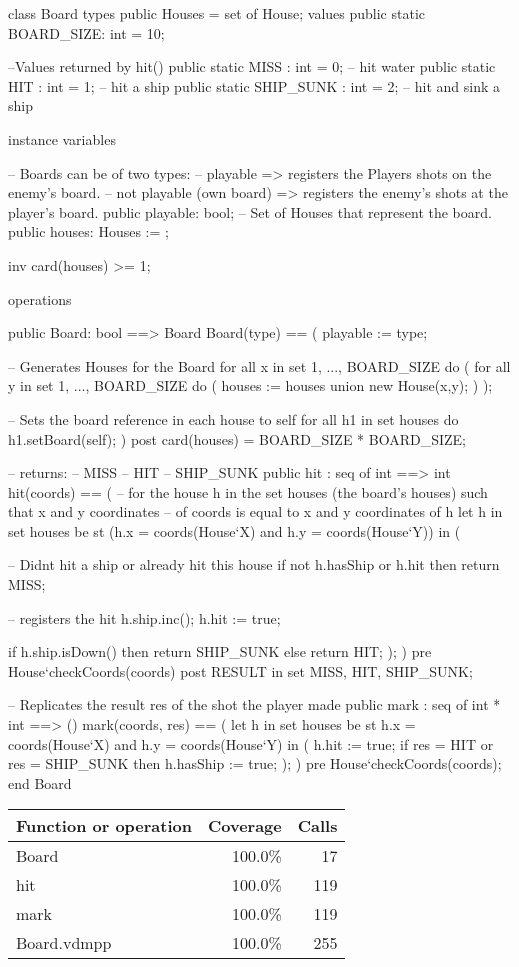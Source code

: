 \begin{vdm_al}
class Board
 types
  public Houses = set of House;
 values
  public static BOARD_SIZE: int = 10;
  
  --Values returned by hit()
  public static MISS : int = 0; -- hit water
  public static HIT : int = 1; -- hit a ship
  public static SHIP_SUNK : int = 2; -- hit and sink a ship
 
 instance variables

  -- Boards can be of two types:
  --  playable => registers the Players shots on the enemy's board.
  --  not playable (own board) => registers the enemy's shots at the player's board. 
  public playable: bool;
  -- Set of Houses that represent the board.
  public houses: Houses := {};
  
  inv card(houses) >= 1;
  
 operations

  public Board: bool ==> Board
   Board(type) == 
   (
    playable := type;
    
    -- Generates Houses for the Board
    for all x in set {1, ..., BOARD_SIZE}  do (
     for all y in set {1, ..., BOARD_SIZE} do (
      houses := houses union {new House(x,y)};
     )
    );
    
    -- Sets the board reference in each house to self
    for all h1 in set houses do h1.setBoard(self);
   )
  post card(houses) = BOARD_SIZE * BOARD_SIZE;
  
  
  -- returns:
  --  MISS
  --  HIT
  --  SHIP_SUNK
  public hit : seq of int ==> int
   hit(coords) ==
   (
    -- for the house h in the set houses (the board's houses) such that x and y coordinates
    --  of coords is equal to x and y coordinates of h 
    let h in set houses be st (h.x = coords(House`X) and h.y = coords(House`Y)) in (
    
     -- Didnt hit a ship or already hit this house
     if not h.hasShip or h.hit then return MISS;

     -- registers the hit
     h.ship.inc();
     h.hit := true;
     
     if h.ship.isDown() then return SHIP_SUNK
     else return HIT;
    );
   )
   pre House`checkCoords(coords)
   post RESULT in set {MISS, HIT, SHIP_SUNK};

  -- Replicates the result res of the shot the player made
  public mark : seq of int * int ==> ()
   mark(coords, res) ==
   (
    let h in set houses be st h.x = coords(House`X) and h.y = coords(House`Y) in (
     h.hit := true;
     if res = HIT or res = SHIP_SUNK then
      h.hasShip := true;
    );
   )
   pre House`checkCoords(coords);     
end Board
\end{vdm_al}
\bigskip
\begin{longtable}{|l|r|r|}
\hline
Function or operation & Coverage & Calls \\
\hline
\hline
Board & 100.0\% & 17 \\
\hline
hit & 100.0\% & 119 \\
\hline
mark & 100.0\% & 119 \\
\hline
\hline
Board.vdmpp & 100.0\% & 255 \\
\hline
\end{longtable}

